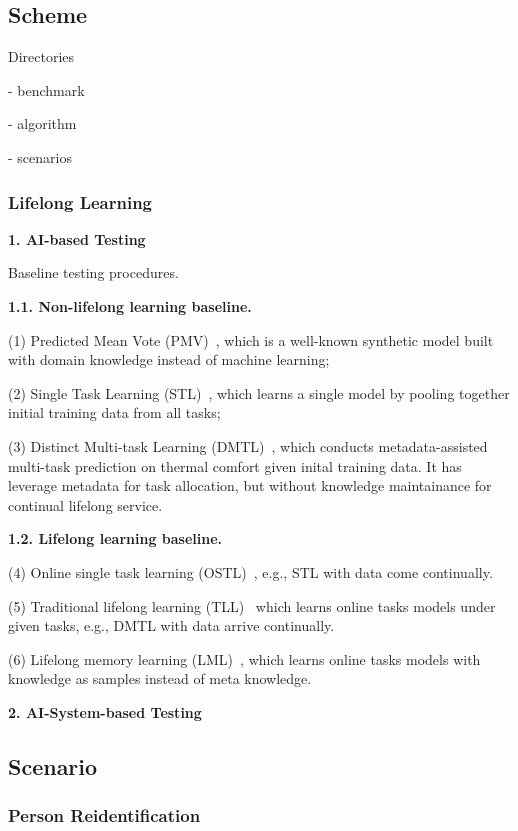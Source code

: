 \subsection{Scheme}

Directories

- benchmark

- algorithm

- scenarios

\subsubsection{Lifelong Learning}

\textbf{1. AI-based Testing}

Baseline testing procedures. 

\textbf{1.1. Non-lifelong learning baseline.}

(1) Predicted Mean Vote (PMV)~\cite{iso05}, which is a well-known synthetic model built with domain knowledge instead of machine learning; 

(2) Single Task Learning (STL)~\cite{peng17data}, which learns a single model by pooling together initial training data from all tasks; 

(3)
Distinct Multi-task Learning (DMTL)~\cite{yang18}, which conducts metadata-assisted multi-task prediction on thermal comfort given inital training data. It has leverage metadata for task allocation, but without knowledge maintainance for continual lifelong service. 

\textbf{1.2. Lifelong learning baseline.}

(4) Online single task learning (OSTL)~\cite{anderson08theory}, e.g., STL with data come continually. 

(5) Traditional lifelong learning (TLL)~\cite{silver13lifelong} which learns online tasks models under given tasks, e.g., DMTL with data arrive continually. 

(6) Lifelong memory learning (LML)~\cite{altman92introduction}, which learns online tasks models with knowledge as samples instead of meta knowledge.



\textbf{2. AI-System-based Testing}



\subsection{Scenario}

\subsubsection{Person Reidentification}
